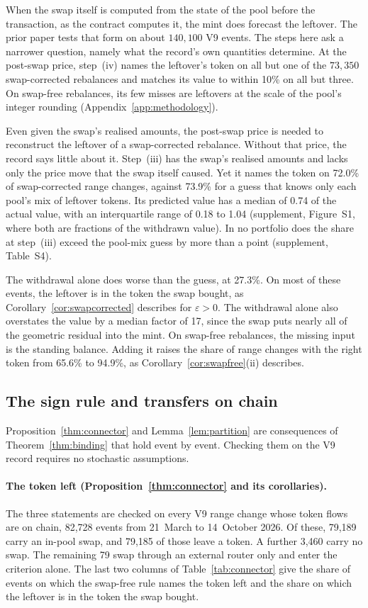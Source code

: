 \documentclass[11pt,a4paper]{article}
\theoremstyle{siphon}
\begin{document}
When the swap itself is computed from the state of the pool before the transaction, as the contract computes it, the mint does forecast the leftover. The prior paper tests that form on about $140{,}100$ V9 events\cite{ryan2026siphon}. The steps here ask a narrower question, namely what the record's own quantities determine. At the post-swap price, step~(iv) names the leftover's token on all but one of the $73{,}350$ swap-corrected rebalances and matches its value to within 10\% on all but three. On swap-free rebalances, its few misses are leftovers at the scale of the pool's integer rounding (Appendix~\ref{app:methodology}).

Even given the swap's realised amounts, the post-swap price is needed to reconstruct the leftover of a swap-corrected rebalance. Without that price, the record says little about it. Step~(iii) has the swap's realised amounts and lacks only the price move that the swap itself caused. Yet it names the token on 72.0\% of swap-corrected range changes, against 73.9\% for a guess that knows only each pool's mix of leftover tokens. Its predicted value has a median of 0.74 of the actual value, with an interquartile range of 0.18 to 1.04 (supplement, Figure~S1, where both are fractions of the withdrawn value). In no portfolio does the share at step~(iii) exceed the pool-mix guess by more than a point (supplement, Table~S4).

The withdrawal alone does worse than the guess, at 27.3\%. On most of these events, the leftover is in the token the swap bought, as Corollary~\ref{cor:swapcorrected} describes for $\varepsilon > 0$. The withdrawal alone also overstates the value by a median factor of 17, since the swap puts nearly all of the geometric residual into the mint. On swap-free rebalances, the missing input is the standing balance. Adding it raises the share of range changes with the right token from 65.6\% to 94.9\%, as Corollary~\ref{cor:swapfree}(ii) describes.

\subsection{The sign rule and transfers on chain}\label{sec:framework_predictions}

Proposition~\ref{thm:connector} and Lemma~\ref{lem:partition} are consequences of Theorem~\ref{thm:binding} that hold event by event. Checking them on the V9 record requires no stochastic assumptions.

\paragraph{The token left (Proposition~\ref{thm:connector} and its corollaries).}
The three statements are checked on every V9 range change whose token flows are on chain, 82{,}728 events from 21~March to 14~October 2026. Of these, 79{,}189 carry an in-pool swap, and 79{,}185 of those leave a token. A further 3{,}460 carry no swap. The remaining 79 swap through an external router only and enter the criterion alone. The last two columns of Table~\ref{tab:connector} give the share of events on which the swap-free rule names the token left and the share on which the leftover is in the token the swap bought.
\end{document}
